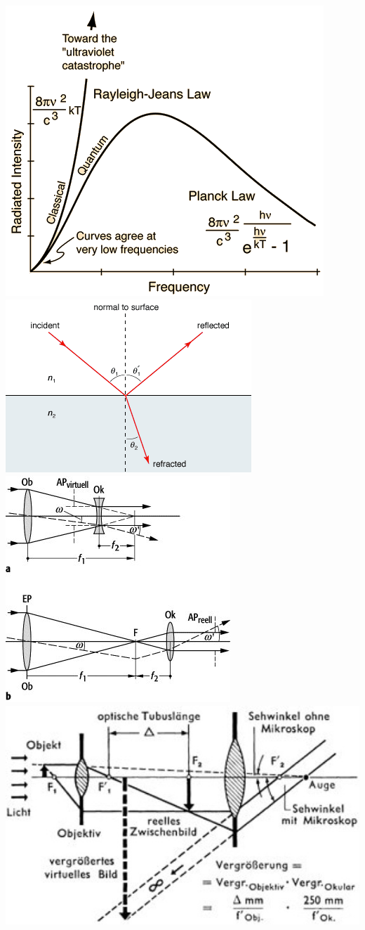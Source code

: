 \documentclass[12pt,a4paper, twoside]{article}
\renewcommand{\=}[1]{\stackrel{#1}{=}}
\theoremstyle{definition}
\theoremstyle{remark}
\begin{document}
\includegraphics[width=0.45\linewidth]{pic/rj.png}
\includegraphics[width=0.45\linewidth]{pic/snellius.png}\\
\includegraphics[width=0.45\linewidth]{pic/teleskop.jpg}
\includegraphics[width=0.45\linewidth]{pic/mikroskop.jpg}
\end{document}
